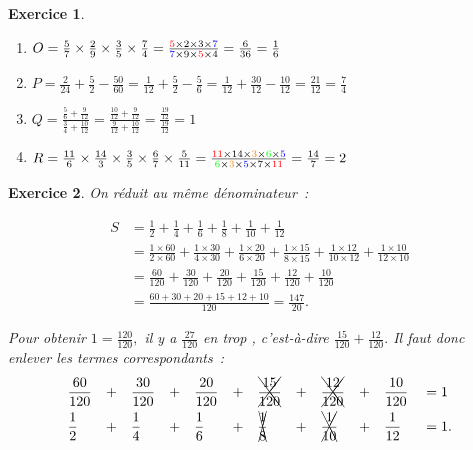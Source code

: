 \documentclass[10pt]{article}
\newtheorem{exo}{Exercice}
\begin{document}
\begin{exo}
\begin{multicols}{2}
\begin{enumerate}
\item $O=\frac{5}{7}\times\frac{2}{9}\times\frac{3}{5}\times\frac{7}{4}
=\frac{\textcolor{red}{5}\times 2\times 3\times \textcolor{blue}{7}}{\textcolor{blue}{7}\times 9\times \textcolor{red}{5}\times 4}=\frac{6}{36}=\frac{1}{6}$
\item $ P=\frac{2}{24}+\frac{5}{2}-\frac{50}{60}=\frac{1}{12}+\frac{5}{2}-\frac{5}{6}=
\frac{1}{12}+\frac{30}{12}-\frac{10}{12}=\frac{21}{12}=\frac{7}{4}$
\item $ Q=\frac{\frac{5}{6}+\frac{9}{12}}{\frac{3}{4}+\frac{10}{12}}
=\frac{\frac{10}{12}+\frac{9}{12}}{\frac{9}{12}+\frac{10}{12}}
=\frac{\frac{19}{12}}{\frac{19}{12}}=1$
\item $ R=\frac{11}{6}\times\frac{14}{3}\times\frac{3}{5}\times\frac{6}{7}\times\frac{5}{11}=\frac{\textcolor{red}{11}\times 14\times \textcolor{orange}{3}\times \textcolor{green}{6}\times \textcolor{blue}{5}}{\textcolor{green}{6}\times \textcolor{orange}{3}\times \textcolor{blue}{5}\times 7\times \textcolor{red}{11}}=\frac{14}{7}=2$
\end{enumerate}
\end{multicols}


\end{exo}

\begin{exo}

On réduit au même dénominateur~:

\begin{align*}
S&=\frac{1}{2}+\frac{1}{4}+\frac{1}{6}+\frac{1}{8}+\frac{1}{10}+\frac{1}{12}\\
&=\frac{1\times 60}{2\times 60}+\frac{1\times 30}{4\times 30}+\frac{1\times 20}{6\times 20}+\frac{1\times  15}{8\times 15}+\frac{1\times 12}{10\times 12}+\frac{1\times 10}{12\times 10}\\
&=\frac{60}{120}+\frac{30}{120}+\frac{20}{120}+\frac{15}{120}+\frac{12}{120}+\frac{10}{120}\\
&=\frac{60+30+20+15+12+10}{120}=\frac{147}{20}.
\end{align*}

Pour obtenir $1=\frac{120}{120},$ il y a $\frac{27}{120}$ \og en trop \fg, c'est-à-dire $\frac{15}{120}+\frac{12}{120}.$ Il faut donc enlever les termes correspondants~:
\begin{align*}&\frac{60}{120}&&+&&\frac{30}{120}&&+&&\frac{20}{120}&&+&&\xcancel{\frac{15}{120}}&&+&&\xcancel{\frac{12}{120}}&&+&&\frac{10}{120}&&=1\\
&\frac{1}{2}&&+&&\frac{1}{4}&&+&&\frac{1}{6}&&+&&\xcancel{\frac{1}{8}}&&+&&\xcancel{\frac{1}{10}}&&+&&\frac{1}{12}&&=1.
\end{align*}
\end{exo}
\end{document}
